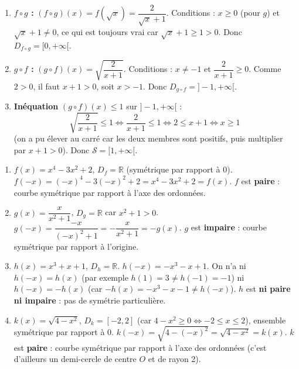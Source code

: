 \documentclass[11pt]{article}
\begin{document}
\begin{corrige}
\begin{enumerate}
    \item \textbf{$f \circ g$ :} $(f\circ g)(x)=f(\sqrt{x})=\dfrac{2}{\sqrt{x}+1}$. Conditions : $x \geqslant 0$ (pour $g$) et $\sqrt{x}+1 \neq 0$, ce qui est toujours vrai car $\sqrt{x}+1 \geqslant 1 > 0$. Donc $D_{f\circ g}=[0,+\infty[$.
    \item \textbf{$g \circ f$ :} $(g\circ f)(x)=\sqrt{\dfrac{2}{x+1}}$. Conditions : $x \neq -1$ et $\dfrac{2}{x+1} \geqslant 0$. Comme $2>0$, il faut $x+1>0$, soit $x>-1$. Donc $D_{g\circ f}=]-1,+\infty[$.
    \item \textbf{Inéquation} $(g\circ f)(x) \leqslant 1$ sur $]-1,+\infty[$ :
    \[ \sqrt{\frac{2}{x+1}} \leqslant 1 \iff \frac{2}{x+1} \leqslant 1 \iff 2 \leqslant x+1 \iff x \geqslant 1 \]
    (on a pu élever au carré car les deux membres sont positifs, puis multiplier par $x+1>0$). Donc $\mathcal{S}=[1,+\infty[$.
\end{enumerate}
\end{corrige}

\begin{corrige}
\begin{enumerate}
    \item $f(x)=x^4-3x^2+2$, $D_f=\mathbb{R}$ (symétrique par rapport à $0$). $f(-x)=(-x)^4-3(-x)^2+2=x^4-3x^2+2=f(x)$. $f$ est \textbf{paire} : courbe symétrique par rapport à l'axe des ordonnées.
    \item $g(x)=\dfrac{x}{x^2+1}$, $D_g=\mathbb{R}$ car $x^2+1>0$. $g(-x)=\dfrac{-x}{(-x)^2+1}=-\dfrac{x}{x^2+1}=-g(x)$. $g$ est \textbf{impaire} : courbe symétrique par rapport à l'origine.
    \item $h(x)=x^3+x+1$, $D_h=\mathbb{R}$. $h(-x)=-x^3-x+1$. On n'a ni $h(-x)=h(x)$ (par exemple $h(1)=3 \neq h(-1)=-1$) ni $h(-x)=-h(x)$ (car $-h(x)=-x^3-x-1 \neq h(-x)$). $h$ est \textbf{ni paire ni impaire} : pas de symétrie particulière.
    \item $k(x)=\sqrt{4-x^2}$, $D_k=[-2,2]$ (car $4-x^2 \geqslant 0 \iff -2 \leqslant x \leqslant 2$), ensemble symétrique par rapport à $0$. $k(-x)=\sqrt{4-(-x)^2}=\sqrt{4-x^2}=k(x)$. $k$ est \textbf{paire} : courbe symétrique par rapport à l'axe des ordonnées (c'est d'ailleurs un demi-cercle de centre $O$ et de rayon 2).
\end{enumerate}
\end{corrige}
\end{document}
